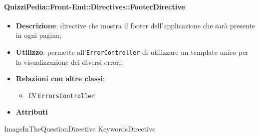 \paragraph{QuizziPedia::Front-End::Directives::FooterDirective}
\begin{itemize}
	\item \textbf{Descrizione}: directive che mostra il footer dell'applicazione che sarà presente in ogni pagina;
	\item \textbf{Utilizzo}: permette all'\texttt{ErrorController} di utilizzare un template unico per la visualizzazione dei diversi errori;
	\item \textbf{Relazioni con altre classi}:
	\begin{itemize}
		\item \textit{IN} \texttt{ErrorsController} \\
	\end{itemize}
	\item \textbf{Attributi}
\end{itemize}



ImageInTheQuestionDirective
KeywordsDirective